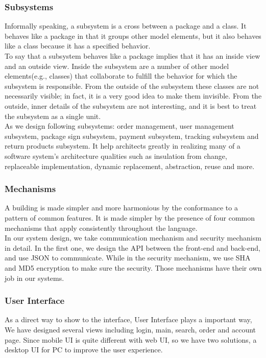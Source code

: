 \documentclass[12pt]{scrreprt}
\begin{document}
\subsubsection{Subsystems}
Informally speaking, a subsystem is a cross between a package and a class. It behaves like a package in that it groups other model elements, but it also behaves like a class because it has a specified behavior.\\
To say that a subsystem behaves like a package implies that it has an inside view and an outside view. Inside the subsystem are a number of other model elements(e.g., classes) that collaborate to fulfill the behavior for which the subsystem is responsible. From the outside of the subsystem these classes are not necessarily visible; in fact, it is a very good idea to make them invisible. From the outside, inner details of the subsystem are not interesting, and it is best to treat the subsystem as a single unit.\\
As we design following subsystems: order management, user management subsystem, package sign subsystem, payment subsystem, tracking subsystem and return products subsystem. It help architects greatly in realizing many of a software system's architecture qualities such as insulation from change, replaceable implementation, dynamic replacement, abstraction, reuse and more.
\subsubsection{Mechanisms}
A building is made simpler and more harmonious by the conformance to a pattern of common features. It is made simpler by the presence of four common mechanisms that apply consistently throughout the language.\\
In our system design, we take communication mechanism and security mechanism in detail. In the first one, we design the API between the front-end and back-end, and use JSON to communicate. While in the security mechanism, we use SHA and MD5 encryption to make sure the security. Those mechanisms have their own job in our systems.
\subsubsection{User Interface}
As a direct way to show to the interface, User Interface plays a important way, We have designed several views including login, main, search, order and account page. Since mobile UI is quite different with web UI, so we have two solutions, a desktop UI for PC to improve the user experience.
\end{document}
